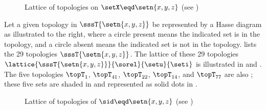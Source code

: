 \begin{figure}[th]
\begin{center}
%
\end{center}
\caption{
  Lattice of topologies on $\setX\eqd\setn{x,y,z}$ (see )
  \label{fig:set_latlat_top_xyz}
  }
\end{figure}


\begin{minipage}{\tw-45mm}
\begin{example}
\label{ex:set_lat_top_xyz}
\footnotemark
Let a given topology in $\sssT{\setn{x,y,z}}$ be represented by a Hasse diagram 
as illustrated to the right, where a circle present means the indicated set is in the topology,
and a circle absent means the indicated set is not in the topology.
 lists the 29 topologies $\sssT{\setn{x,y,z}}$.
The lattice of these 29 topologies $\lattice{\sssT{\setn{x,y,z}}}{\sorel}{\setu}{\seti}$
is illustrated in  and .
The five topologies
$\topT_{1}$, $\topT_{41}$, $\topT_{22}$, $\topT_{14}$, and $\topT_{77}$
are also ; 
these five sets are shaded in  and represented as solid dots in
.
\end{example}%
\end{minipage}%
\hfill%
%
\begin{minipage}{42mm}%

\end{minipage}%


\begin{figure}[th]
\begin{center}
\end{center}
\caption{
  Lattice of topologies of $\sid\eqd\setn{x,y,z}$ (see )
  \label{fig:set_lat_top_xyz}
  }
\end{figure}

